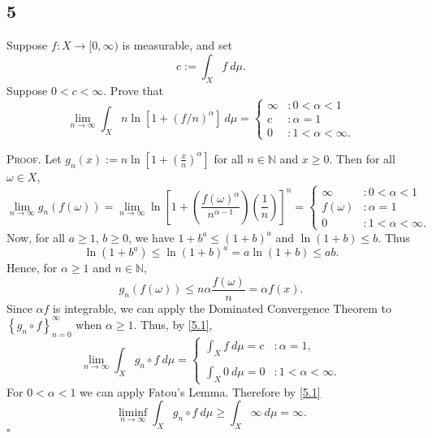 \documentclass[12pt]{article}
\newcounter{ProofCounter}
\newenvironment{Proof}{\stepcounter{ProofCounter}\textsc{Proof.}}{\hfill$\square$}
\begin{document}
\newpage
\subsection*{5}
\begin{tcolorbox}
Suppose $f : X \rightarrow [0, \infty)$ is measurable, and set 
\[ c := \int_{X}f\ d\mu. \]
Suppose $0 < c < \infty$. Prove that 
\[ \lim_{n\rightarrow\infty}\int_{X}n\ln[1 + (f/n)^{\alpha}]\ d\mu = \left\{ \begin{array}{cl}
\infty & : 0 < \alpha < 1 \\
c & : \alpha = 1 \\
0 & : 1 < \alpha < \infty.
\end{array} \right.
\]
\end{tcolorbox}



\begin{Proof}
Let $g_{n}(x) := n\ln\left[ 1 + \left( \frac{x}{n} \right)^{\alpha} \right]$ for all $n \in \mathbb{N}$ and $x \geq 0$. Then for all $\omega \in X$,
\begin{equation}
\lim_{n\rightarrow\infty}g_{n}(f(\omega)) = \lim_{n\rightarrow\infty}\ln\left[ 1 + \left( \frac{f(\omega)^{\alpha}}{n^{\alpha - 1}} \right)\left( \frac{1}{n} \right)
 \right]^{n} = \left\{ \begin{array}{cl}
\infty & : 0 < \alpha < 1 \\
f(\omega) & : \alpha = 1 \\
0 & : 1 < \alpha < \infty.
\end{array} \right.
\label{5.1}
\end{equation}
Now, for all $a \geq 1$, $b \geq 0$, we have $1 + b^{a} \leq (1 + b)^{a}$ and $\ln(1 + b) \leq b$. Thus 
\[ \ln(1 + b^{a}) \leq \ln(1 + b)^{a} = a \ln(1 + b) \leq a b. \]
Hence, for $\alpha \geq 1$ and $n \in \mathbb{N}$,
\[ g_{n}(f(\omega)) \leq n\alpha\frac{f(\omega)}{n} = \alpha f(x). \]
Since $\alpha f$ is integrable, we can apply the Dominated Convergence Theorem to $\left\{ g_{n}\circ f \right\}_{n=0}^{\infty}$ when $\alpha \geq 1$. 
Thus, by \eqref{5.1},
\[ \lim_{n\rightarrow\infty}\int_{X}g_{n}\circ f\ d\mu = \left\{\begin{array}{ll}
\int_{X}f\ d\mu = c & : \alpha = 1,\\ \\
\int_{X}0\ d\mu = 0 & : 1 < \alpha < \infty.
\end{array} \right.
\]
For $0 < \alpha < 1$ we can apply Fatou's Lemma. Therefore by \eqref{5.1} 
\[ \liminf_{n\rightarrow\infty}\int_{X}g_{n}\circ f\ d\mu \geq \int_{X}\infty\ d\mu = \infty. \]
\end{Proof}
\end{document}
